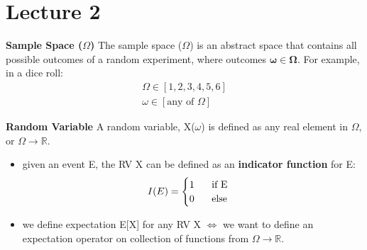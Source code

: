 \section{Lecture 2}

\begin{defn}\textbf{Sample Space ($\Omega$)}
    The sample space ($\Omega$) is an abstract space that contains all possible outcomes of a random experiment, where outcomes $\mathbf{\omega \in \Omega}$. For example, in a dice roll:
    \begin{align*}
        \Omega \in [1, 2, 3, 4, 5, 6] \\
        \omega \in [\text{any of } \Omega]
    \end{align*}
\end{defn}
\begin{defn}\textbf{Random Variable}
    A random variable, X($\omega$) is defined as any real element in $\Omega$, or $\Omega \rightarrow \mathbb{R}$.
    \begin{itemize}
        \item given an event E, the RV X can be defined as an \textbf{indicator function} for E:
        \begin{equation*}
            I(E) = \begin{cases}
                1 \hspace{0.5cm} \text{ if E}\\
                0 \hspace{0.5cm} \text{ else}
            \end{cases}
        \end{equation*}
        \item we define expectation E[X] for any RV X $\iff$ we want to define an expectation operator on collection of functions from $\Omega \rightarrow \mathbb{R}$.
    \end{itemize}

\end{defn}

